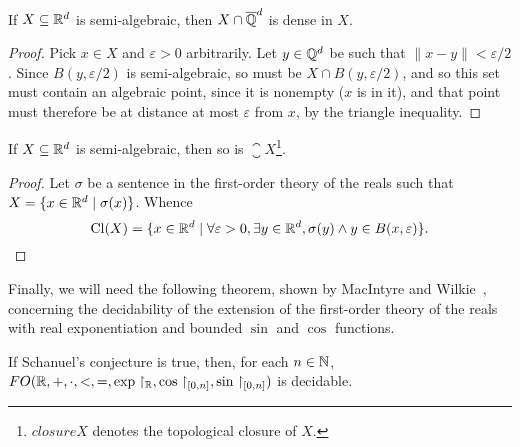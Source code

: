 \begin{lemma}
\label{lem:semi-alg-density}
If $X\subseteq\mathbb{R}^{d}$ is semi-algebraic, then $X\cap\overline{\mathbb{Q}}^{d}$ is dense in $X$.
\end{lemma}

\begin{proof}
  Pick $x\in X$ and $\varepsilon>0$ arbitrarily. Let
  $y\in\mathbb{Q}^{d}$ be such that $\| x-y \|<\varepsilon/2$. Since
  $B(y,\varepsilon/2)$ is semi-algebraic, so must be $X\cap
  B(y,\varepsilon/2)$, and so this set must contain an algebraic
  point, since it is nonempty ($x$ is in it), and that point must
  therefore be at distance at most $\varepsilon$ from $x$, by the
  triangle inequality.
\end{proof}

\begin{lemma}
\label{lem:semi-alg-closure}
If $X\subseteq\mathbb{R}^{d}$ is semi-algebraic, then so is $\closure{X}$\footnote{$closure{X}$ denotes the topological closure of $X$.}.
\end{lemma}

\begin{proof}
  Let $\sigma$ be a sentence in the first-order theory of the reals such
  that $X=\lbrace x\in\mathbb{R}^{d}\mid \sigma(x)\rbrace$. Whence
\begin{equation*}
  \operatorname{Cl}(X)=\lbrace x\in\mathbb{R}^{d}\mid
\forall \varepsilon>0,\exists y\in\mathbb{R}^{d},\sigma(y)\wedge y\in B(x,\varepsilon) \rbrace .
\end{equation*}
\end{proof}

Finally, we will need the following theorem, shown by MacIntyre and Wilkie~\cite{WM}, concerning the decidability of the extension of the first-order theory of the reals with real exponentiation and bounded $\sin$ and $\cos$ functions.
\begin{theorem}
\label{thm:wilkie-macintyre}
  If Schanuel's conjecture is true, then, for each $n \in \mathbb{N}$,
  $FO(\mathbb{R}, +, \cdot, <, =, \exp \restriction_{\mathbb{R}}, \cos\restriction_{[0, n]}, \sin\restriction_{[0,n]})$ is decidable.
\end{theorem}
